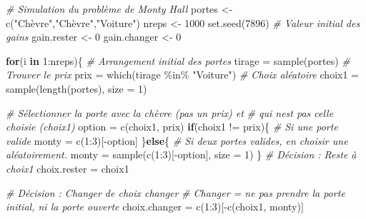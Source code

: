 \documentclass[
]{book}
\newenvironment{Shaded}{}{}
\newcommand{\AttributeTok}[1]{#1}
\newcommand{\CommentTok}[1]{\textit{#1}}
\newcommand{\ControlFlowTok}[1]{\textbf{#1}}
\newcommand{\DecValTok}[1]{#1}
\newcommand{\FunctionTok}[1]{#1}
\newcommand{\NormalTok}[1]{#1}
\newcommand{\OtherTok}[1]{#1}
\newcommand{\SpecialCharTok}[1]{#1}
\newcommand{\StringTok}[1]{#1}
\begin{document}
\begin{Shaded}
\begin{Highlighting}[]
\CommentTok{\# Simulation du problème de Monty Hall}
\NormalTok{portes }\OtherTok{\textless{}{-}} \FunctionTok{c}\NormalTok{(}\StringTok{"Chèvre"}\NormalTok{,}\StringTok{"Chèvre"}\NormalTok{,}\StringTok{"Voiture"}\NormalTok{)}
\NormalTok{nreps }\OtherTok{\textless{}{-}} \DecValTok{1000}
\FunctionTok{set.seed}\NormalTok{(}\DecValTok{7896}\NormalTok{)}
\CommentTok{\# Valeur initial des gains}
\NormalTok{gain.rester }\OtherTok{\textless{}{-}} \DecValTok{0}
\NormalTok{gain.changer }\OtherTok{\textless{}{-}} \DecValTok{0}

\ControlFlowTok{for}\NormalTok{(i }\ControlFlowTok{in} \DecValTok{1}\SpecialCharTok{:}\NormalTok{nreps)\{}
  \CommentTok{\# Arrangement initial des portes}
\NormalTok{  tirage }\OtherTok{=} \FunctionTok{sample}\NormalTok{(portes)}
  \CommentTok{\# Trouver le prix}
\NormalTok{  prix }\OtherTok{=} \FunctionTok{which}\NormalTok{(tirage }\SpecialCharTok{\%in\%} \StringTok{"Voiture"}\NormalTok{)}
  \CommentTok{\# Choix aléatoire}
\NormalTok{  choix1 }\OtherTok{=} \FunctionTok{sample}\NormalTok{(}\FunctionTok{length}\NormalTok{(portes), }\AttributeTok{size =} \DecValTok{1}\NormalTok{)}
  
  \CommentTok{\# Sélectionner la porte avec la chèvre (pas un prix) et}
  \CommentTok{\# qui n\textquotesingle{}est pas celle choisie (choix1)}
\NormalTok{  option }\OtherTok{=} \FunctionTok{c}\NormalTok{(choix1, prix)}
  \ControlFlowTok{if}\NormalTok{(choix1 }\SpecialCharTok{!=}\NormalTok{ prix)\{}
    \CommentTok{\# Si une porte valide}
\NormalTok{    monty }\OtherTok{=} \FunctionTok{c}\NormalTok{(}\DecValTok{1}\SpecialCharTok{:}\DecValTok{3}\NormalTok{)[}\SpecialCharTok{{-}}\NormalTok{option]}
\NormalTok{  \}}\ControlFlowTok{else}\NormalTok{\{}
    \CommentTok{\# Si deux portes valides, en choisir une aléatoirement.}
\NormalTok{    monty }\OtherTok{=} \FunctionTok{sample}\NormalTok{(}\FunctionTok{c}\NormalTok{(}\DecValTok{1}\SpecialCharTok{:}\DecValTok{3}\NormalTok{)[}\SpecialCharTok{{-}}\NormalTok{option], }\AttributeTok{size =} \DecValTok{1}\NormalTok{)}
\NormalTok{  \}}
  \CommentTok{\# Décision : Reste à choix1}
\NormalTok{  choix.rester }\OtherTok{=}\NormalTok{ choix1}
  
  \CommentTok{\# Décision : Changer de choix changer}
  \CommentTok{\# Changer = ne pas prendre la porte initial, ni la porte ouverte}
\NormalTok{  choix.changer }\OtherTok{=} \FunctionTok{c}\NormalTok{(}\DecValTok{1}\SpecialCharTok{:}\DecValTok{3}\NormalTok{)[}\SpecialCharTok{{-}}\FunctionTok{c}\NormalTok{(choix1, monty)]}
  

\end{Highlighting}
\end{Shaded}
\end{document}
